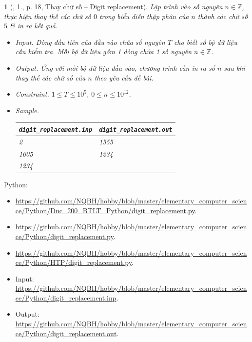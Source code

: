 \documentclass{article}
\newtheorem{baitoan}{}
\begin{document}
\begin{baitoan}[\cite{Duc_200_BT_Python}, 1., p. 18, Thay chữ số -- Digit replacement]
	Lập trình vào số nguyên $n\in\mathbb{Z}$, thực hiện thay thế các chữ số $0$ trong biểu diễn thập phân của $n$ thành các chữ số $5$ \& in ra kết quả.
	\begin{itemize}
		\item {\sf Input.} Dòng đầu tiên của đầu vào chứa số nguyên $T$ cho biết số bộ dữ liệu cần kiểm tra. Mỗi bộ dữ liệu gồm 1 dòng chứa 1 số nguyên $n\in\mathbb{Z}$.
		\item {\sf Output.} Ứng với mỗi bộ dữ liệu đầu vào, chương trình cần in ra số $n$ sau khi thay thế các chữ số của $n$ theo yêu cầu đề bài.
		\item {\sf Constraint.} $1\le T\le10^5$, $0\le n\le10^{12}$.
		\item {\sf Sample.}
		\begin{table}[H]
			\centering
			\begin{tabular}{|l|l|}
				\hline
				\verb|digit_replacement.inp| & \verb|digit_replacement.out| \\
				\hline
				2 & 1555 \\
				1005 & 1234 \\
				1234 &  \\
				\hline
			\end{tabular}
		\end{table}
	\end{itemize}
\end{baitoan}
Python:
\begin{itemize}
	\item {\small\url{https://github.com/NQBH/hobby/blob/master/elementary_computer_science/Python/Duc_200_BTLT_Python/digit_replacement.py}}.
	\item \url{https://github.com/NQBH/hobby/blob/master/elementary_computer_science/Python/digit_replacement.py}.
	\item \url{https://github.com/NQBH/hobby/blob/master/elementary_computer_science/Python/HTP/digit_replacement.py}.
	\item Input: \url{https://github.com/NQBH/hobby/blob/master/elementary_computer_science/Python/digit_replacement.inp}.
	\item Output: \url{https://github.com/NQBH/hobby/blob/master/elementary_computer_science/Python/digit_replacement.out}.
\end{itemize}
\end{document}
